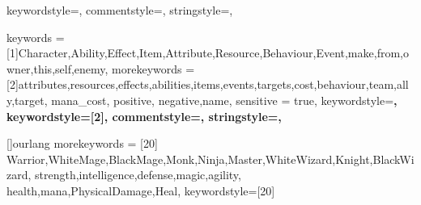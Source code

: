 
{
	keywordstyle=\color{blue},          %
	commentstyle=\color{dkgreen},       %
	stringstyle=\color{mauve},         %
}

{
	keywords = {[1]Character,Ability,Effect,Item,Attribute,Resource,Behaviour,Event,make,from,owner,this,self,enemy},
	morekeywords = {[2]attributes,resources,effects,abilities,items,events,targets,cost,behaviour,team,ally,target, mana_cost, positive, negative,name},
	sensitive = true,
	keywordstyle=\color{black}\bfseries,          %
	keywordstyle={[2]\color{gray}\bfseries},
	commentstyle=\color{dkgreen},       %
	stringstyle=\color{gray}\bfseries,         %
}

[]{ourlang}
{
	morekeywords = [20]{
		Warrior,WhiteMage,BlackMage,Monk,Ninja,Master,WhiteWizard,Knight,BlackWizard,
		strength,intelligence,defense,magic,agility,
		health,mana,PhysicalDamage,Heal},
	keywordstyle={[20]\color{gray}\bfseries}
}